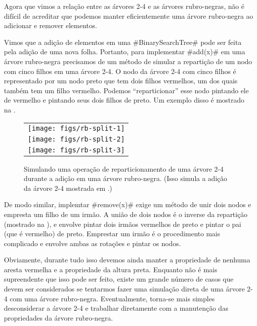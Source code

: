 Agora que vimos a relação entre as árvores 2-4 e as 
árvores rubro-negras, não é difícil de acreditar que podemos manter eficientemente uma árvore rubro-negra ao adicionar e remover elementos. 

Vimos que a adição de elementos em uma 
 #BinarySearchTree#
 pode ser feita pela adição de uma nova folha. Portanto, para implementar 
#add(x)# em uma árvore rubro-negra precisamos de um método de simular
a repartição de um nodo com cinco filhos em uma 
árvore 2-4.  O nodo da árvore 2-4 com cinco filhos é representado por
um nodo preto que tem dois filhos vermelhos, um dos quais também tem um filho
vermelho. Podemos ``reparticionar'' esse nodo pintando ele de vermelho
e pintando seus dois filhos de preto. 
Um exemplo disso é mostrado na 
 .

\begin{figure}
  \begin{center}
   \begin{tabular}{c}
     \texttt{[image: figs/rb-split-1]} \\
     \texttt{[image: figs/rb-split-2]} \\
     \texttt{[image: figs/rb-split-3]} \\
   \end{tabular}
  \end{center}
  \caption[Simulando uma árvore 2-4]{Simulando uma operação de reparticionamento de uma árvore 2-4 durante a adição em uma árvore rubro-negra. (Isso simula
  a adição da árvore 2-4 mostrada em 
     .)}
\end{figure}

De modo similar, implemtar 
#remove(x)# exige um método de unir dois nodos e empresta um filho de um irmão.
A união de dois nodos é o inverse da repartição (mostrado na 
), e envolve pintar dois irmãos vermelhos de preto e pintar o pai (que é vermelho) de preto. Emprestar um irmão é o procedimento mais complicado
e envolve ambas as rotações e pintar os nodos.

Obviamente, durante tudo isso devemos ainda manter a propriedade de nenhuma aresta 
vermelha e a propriedade da altura preta. Enquanto não é mais supreendente 
que isso pode ser feito, existe um grande número de casos que devem ser considerados
se tentarmos fazer uma simulação direta de uma 
árvore 2-4 com uma árvore rubro-negra. 
Eventualmente, torna-se mais simples desconsiderar a árvore 2-4 e trabalhar
diretamente com a manutenção das propriedades da árvore rubro-negra.

